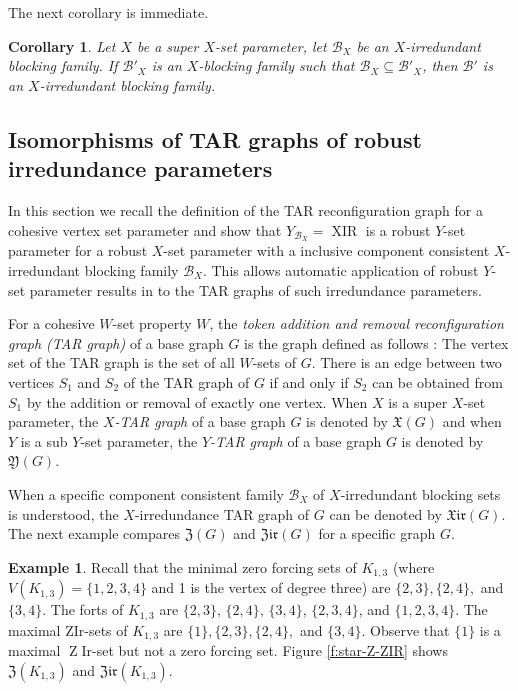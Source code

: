 \documentclass{article}
\numberwithin{figure}{section}
\numberwithin{table}{section}
\numberwithin{equation}{section}
\newtheorem{cor}[thm]{Corollary}
\theoremstyle{definition}
\theoremstyle{definition}
\theoremstyle{definition}
\newtheorem{ex}[thm]{Example}
\newcommand{\B}{\mathcal{B}}
\newcommand{\Z}{\operatorname{Z}}
\newcommand{\xtar}{\mathfrak{X}}%
\newcommand{\ztar}{\mathfrak{Z}}%
\newcommand{\zirtar}{\mathfrak{Zir}}%
\newcommand{\xirtar}{\mathfrak{Xir}}
\DeclareMathOperator{\XIR}{XIR}
\newcommand{\ytar}{\mathfrak{Y}}
\begin{document}
The next corollary is immediate.
\begin{cor}
    Let $X$ be a super $X$-set parameter, let $ \B_X$ be an $X$-irredundant blocking family. If $\B'_X$ is an $X$-blocking family such that $\B_X\subseteq \B'_X$, then $\B'$ is an $X$-irredundant blocking family. 
\end{cor}





  






 


\subsection{Isomorphisms of TAR graphs of robust irredundance parameters}\label{ss:TAR}

In this section we recall the definition of the TAR reconfiguration graph for a cohesive vertex set parameter 
and show that $Y_{\B_X}=\XIR$ is a robust $Y$-set parameter for a robust $X$-set parameter with a inclusive component consistent $X$-irredundant blocking family $\B_X$.  This allows automatic application of robust $Y$-set parameter results in \cite{XTAR-YTAR} to the TAR graphs of such irredundance parameters.  


  For a cohesive $W$-set property $W$,   the {\em token addition and removal  reconfiguration graph (TAR graph)}  of a  base graph  $G$ is the graph defined as follows \cite{XTAR-YTAR}:  The vertex set of the TAR graph is  the set of all  $W$-sets of $G$.  There is an edge between  two vertices  $S_1$ and $S_2$ of the TAR graph of $G$ if and only if  $S_2$ can be obtained from $S_1$ by the addition or removal of exactly one vertex.
 When $X$ is a super $X$-set parameter, the {\em $X$-TAR graph}  of a  base graph  $G$ is denoted by  $\xtar(G)$ and  when $Y$ is a sub $Y$-set parameter, the {\em $Y$-TAR graph}  of a  base graph  $G$ is denoted by  $\ytar(G)$.


 When a specific component consistent family $\B_X$ of  $X$-irredundant blocking sets is understood, the $X$-irredundance TAR graph of $G$ can be denoted by $\xirtar(G)$.
 The next example compares   $\ztar(G)$ and $\zirtar(G)$ for a specific graph $G$.

\begin{ex}\label{ex:star-Ztar-ZIRtar}
  Recall that the minimal zero forcing sets of  $K_{1,3}$ (where $V(K_{1,3})=\{1,2,3,4\}$ and  1 is the vertex of degree three) are $\{2,3\}, \{2,4\},$ and $ \{3,4\}$. 
  The forts of $K_{1,3}$ are $\{2,3\}$, $\{2,4\}$, $\{3,4\}$,  $\{2,3,4\}$, and $\{1, 2,3, 4\}$.    The maximal ZIr-sets of $K_{1,3}$ are $\{1\}, \{2,3\}, \{2,4\},$ and $\{3,4\}$. Observe that $\{1\}$ is a maximal $\Z$Ir-set but not a zero forcing set. Figure \ref{f:star-Z-ZIR} shows  $\ztar(K_{1,3})$ and $\zirtar(K_{1,3})$.  
\end{ex}
\end{document}
